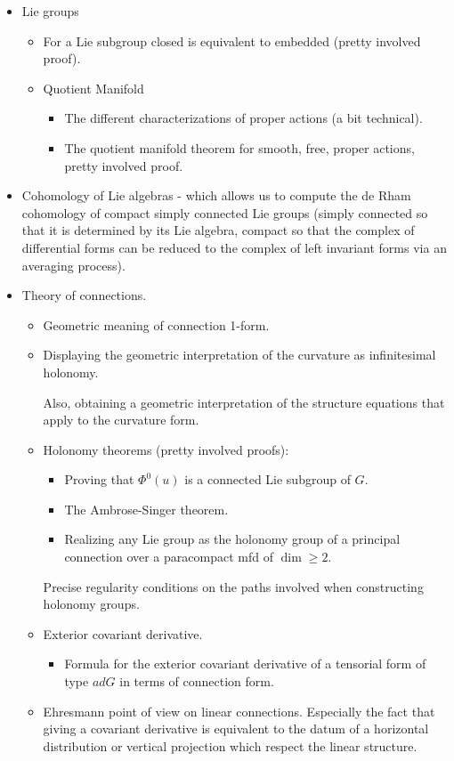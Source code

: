 \documentclass{report}
\theoremstyle{definition}
\begin{document}
\begin{itemize}
\begin{itemize}
    \end{itemize}
    \item Lie groups
    \begin{itemize}
        \item For a Lie subgroup closed is equivalent to embedded (pretty involved proof).
        \item Quotient Manifold
        \begin{itemize}
            \item The different characterizations of proper actions (a bit technical).
            \item The quotient manifold theorem for smooth, free, proper actions, pretty involved proof.
        \end{itemize}
    \end{itemize}
    \item Cohomology of Lie algebras - which allows us to compute the de Rham cohomology of compact simply connected Lie groups (simply connected so that it is determined by its Lie algebra, compact so that the complex of differential forms can be reduced to the complex of left invariant forms via an averaging process).

    \item Theory of connections.
    \begin{itemize}
        \item Geometric meaning of connection 1-form.
        \item Displaying the geometric interpretation of the curvature as infinitesimal holonomy.

        Also, obtaining a geometric interpretation of the structure equations that apply to the curvature form.
        \item Holonomy theorems (pretty involved proofs):
        \begin{itemize}
            \item Proving that $\Phi^0(u)$ is a connected Lie subgroup of $G$.
            \item The Ambrose-Singer theorem.
            \item Realizing any Lie group as the holonomy group of a principal connection over a paracompact mfd of $\dim\geq 2$.
        \end{itemize}

        Precise regularity conditions on the paths involved when constructing holonomy groups.
        \item Exterior covariant derivative.
        \begin{itemize}
            \item Formula for the exterior covariant derivative of a tensorial form of type $adG$ in terms of connection form.
        \end{itemize}
        \item Ehresmann point of view on linear connections. Especially the fact that giving a covariant derivative is equivalent to the datum of a horizontal distribution or vertical projection which respect the linear structure.


\end{itemize}
\end{itemize}
\end{document}
